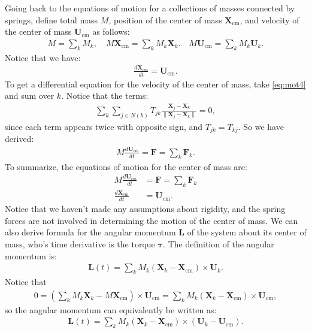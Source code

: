\documentclass[10pt]{article}
\newcommand{\bs}[1]{{\boldsymbol #1}}
\begin{document}
Going back to the equations of motion for a collections of masses connected by springs, define total mass $M$, position of the center of mass ${\bs X}_\text{cm}$, and velocity of the center of mass ${\bs U}_\text{cm}$ as follows:
\begin{align*}
M = \sum_k M_k, \quad M {\bs X}_\text{cm} = \sum_k M_k {\bs X}_k. \quad M {\bs U}_\text{cm} = \sum_k M_k {\bs U}_k.
\end{align*}
Notice that we have:
\begin{align*}
\frac{d {\bs X}_\text{cm}}{dt} = {\bs U}_\text{cm}.
\end{align*}
To get a differential equation for the velocity of the center of mass, take \eqref{eq:mot4} and sum over $k$.  Notice that the terms:
\begin{align*}
\sum_k \sum_{j \in N(k)} T_{jk} \frac{{\bs X}_j - {\bs X}_k}{\| {\bs X}_j - {\bs X}_k \|} = 0,
\end{align*}
since each term appears twice with opposite sign, and $T_{jk} = T_{kj}$.  So we have derived:
\begin{align*}
M\frac{d {\bs U}_\text{cm}}{dt} = {\bs F} = \sum_k {\bs F}_k.
\end{align*}
To summarize, the equations of motion for the center of mass are:
\begin{align}
\label{eq:rigmot1}
M\frac{d {\bs U}_\text{cm}}{dt} &= {\bs F} = \sum_k {\bs F}_k \\
\label{eq:rigmot2}
\frac{d {\bs X}_\text{cm}}{dt} &= {\bs U}_\text{cm}.
\end{align}
Notice that we haven't made any assumptions about rigidity, and the spring forces are not involved in determining the motion of the center of mass.  We can also derive formula for the angular momentum ${\bs L}$ of the system about its center of mass, who's time derivative is the torque ${\bs \tau}$.  The definition of the angular momentum is:
\begin{align*}
{\bs L}(t) = \sum_k M_k ({\bs X}_k - {\bs X}_\text{cm}) \times {\bs U}_k.
\end{align*}
Notice that 
\begin{align}
\label{eq:rand1}
0 = \left( \sum_k M_k {\bs X}_k - M{\bs X}_\text{cm} \right) \times {\bs U}_\text{cm} = \sum_k M_k ({\bs X}_k - {\bs X}_\text{cm}) \times {\bs U}_\text{cm},
\end{align}
so the angular momentum can equivalently be written as:
\begin{align*}
{\bs L}(t) = \sum_k M_k ({\bs X}_k - {\bs X}_\text{cm}) \times ({\bs U}_k - {\bs U}_\text{cm}).
\end{align*}
\end{document}
